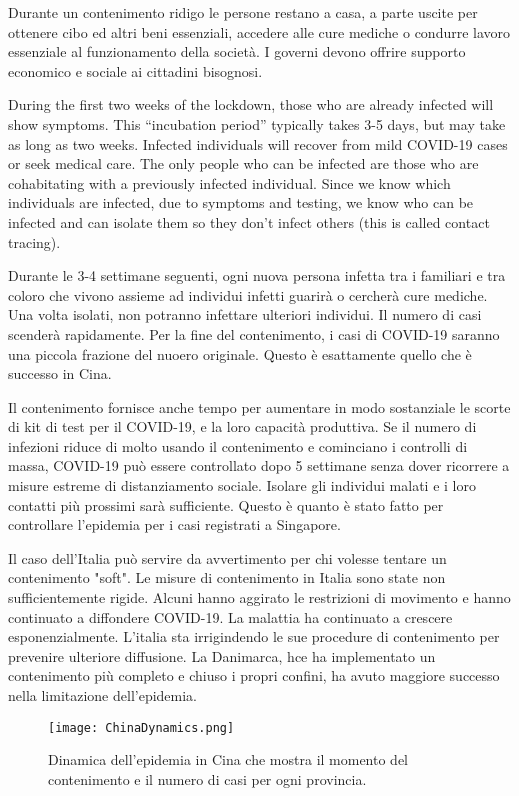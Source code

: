 \documentclass[onecolumn,journal]{IEEEtran}
\begin{document}
\begin{multicols}{2}

Durante un contenimento ridigo le persone restano a casa, a parte uscite per ottenere cibo ed altri beni essenziali, accedere alle cure mediche o condurre lavoro essenziale al funzionamento della società. I governi devono offrire supporto economico e sociale ai cittadini bisognosi.

During the first two weeks of the lockdown, those who are already infected will show symptoms. This “incubation period” typically takes 3-5 days, but may take as long as two weeks. Infected individuals will recover from mild COVID-19 cases or seek medical care. The only people who can be infected are those who are cohabitating with a previously infected individual. Since we know which individuals are infected, due to symptoms and testing, we know who can be infected and can isolate them so they don’t infect others (this is called contact tracing).

Durante le 3-4 settimane seguenti, ogni nuova persona infetta tra i familiari e tra coloro che vivono assieme ad individui infetti guarirà o cercherà cure mediche. Una volta isolati, non potranno infettare ulteriori individui. Il numero di casi scenderà rapidamente. Per la fine del contenimento, i casi di COVID-19 saranno una piccola frazione del nuoero originale. Questo è esattamente quello che è successo in Cina.

Il contenimento fornisce anche tempo per aumentare in modo sostanziale le scorte di kit di test per il COVID-19, e la loro capacità produttiva. Se il numero di infezioni riduce di molto usando il contenimento e cominciano i controlli di massa, COVID-19 può essere controllato dopo 5 settimane senza dover ricorrere a misure estreme di distanziamento sociale. Isolare gli individui malati e i loro contatti più prossimi sarà sufficiente. Questo è quanto è stato fatto per controllare l'epidemia per i casi registrati a Singapore.

Il caso dell'Italia può servire da avvertimento per chi volesse tentare un contenimento "soft". Le misure di contenimento in Italia sono state non sufficientemente rigide. Alcuni hanno aggirato le restrizioni di movimento e hanno continuato a diffondere COVID-19. La malattia ha continuato a crescere esponenzialmente. L'italia sta irrigindendo le sue procedure di contenimento per prevenire ulteriore diffusione. La Danimarca, hce ha implementato un contenimento più completo e chiuso i propri confini, ha avuto maggiore successo nella limitazione dell'epidemia.

\end{multicols}

\begin{figure}[H]
\begin{centering}
\captionsetup{justification=centering}
\texttt{[image: ChinaDynamics.png]}
\caption{Dinamica dell'epidemia in Cina che mostra il momento del contenimento e il numero di casi per ogni provincia.}
\end{centering}
\end{figure}




% 
\end{document}
